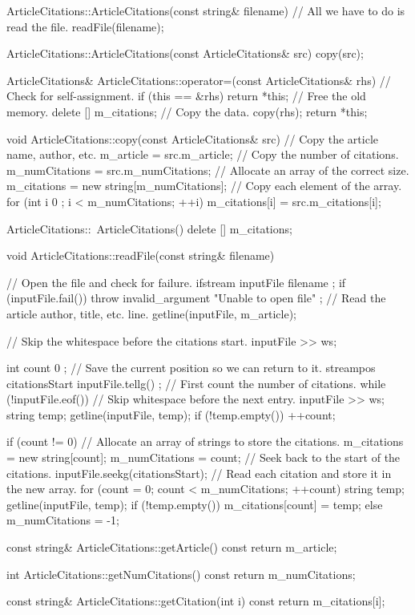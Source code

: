 \begin{cpp}
ArticleCitations::ArticleCitations(const string& filename)
{
    // All we have to do is read the file.
    readFile(filename);
}

ArticleCitations::ArticleCitations(const ArticleCitations& src)
{
    copy(src);
}

ArticleCitations& ArticleCitations::operator=(const ArticleCitations& rhs)
{
    // Check for self-assignment.
    if (this == &rhs) {
        return *this;
    }
    // Free the old memory.
    delete [] m_citations;
    // Copy the data.
    copy(rhs);
    return *this;
}

void ArticleCitations::copy(const ArticleCitations& src)
{
    // Copy the article name, author, etc.
    m_article = src.m_article;
    // Copy the number of citations.
    m_numCitations = src.m_numCitations;
    // Allocate an array of the correct size.
    m_citations = new string[m_numCitations];
    // Copy each element of the array.
    for (int i { 0 }; i < m_numCitations; ++i) {
        m_citations[i] = src.m_citations[i];
    }
}

ArticleCitations::~ArticleCitations()
{
    delete [] m_citations;
}

void ArticleCitations::readFile(const string& filename)
{
    // Open the file and check for failure.
    ifstream inputFile { filename };
    if (inputFile.fail()) {
        throw invalid_argument { "Unable to open file" };
    }
    // Read the article author, title, etc. line.
    getline(inputFile, m_article);

    // Skip the whitespace before the citations start.
    inputFile >> ws;

    int count { 0 };
    // Save the current position so we can return to it.
    streampos citationsStart { inputFile.tellg() };
    // First count the number of citations.
    while (!inputFile.eof()) {
        // Skip whitespace before the next entry.
        inputFile >> ws;
        string temp;
        getline(inputFile, temp);
        if (!temp.empty()) {
            ++count;
        }
    }

    if (count != 0) {
        // Allocate an array of strings to store the citations.
        m_citations = new string[count];
        m_numCitations = count;
        // Seek back to the start of the citations.
        inputFile.seekg(citationsStart);
        // Read each citation and store it in the new array.
        for (count = 0; count < m_numCitations; ++count) {
            string temp;
            getline(inputFile, temp);
            if (!temp.empty()) {
                m_citations[count] = temp;
            }
        }
    } else {
        m_numCitations = -1;
    }
}

const string& ArticleCitations::getArticle() const { return m_article; }

int ArticleCitations::getNumCitations() const { return m_numCitations; }

const string& ArticleCitations::getCitation(int i) const { return m_citations[i]; }
\end{cpp}

